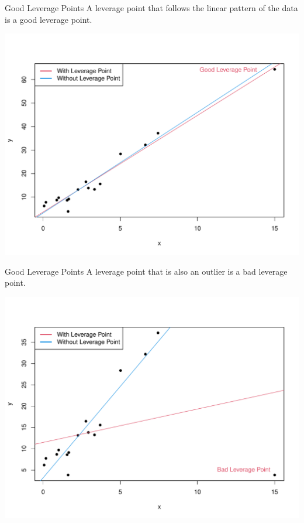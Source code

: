 \documentclass{beamer}
\begin{document}
\begin{frame}{Good Leverage Points}
    A leverage point that follows the linear pattern of the data is a good leverage point. 
    \vspace*{-1em}
    \begin{center}
        \includegraphics[width=.9\linewidth]{figures/good_leverage.pdf}
    \end{center}
\end{frame}

\begin{frame}{Good Leverage Points}
    A leverage point that is also an outlier is a bad leverage point.
    \vspace*{-1em}
    \begin{center}
        \includegraphics[width=.9\linewidth]{figures/bad_leverage.pdf}
    \end{center}
\end{frame}
\end{document}

